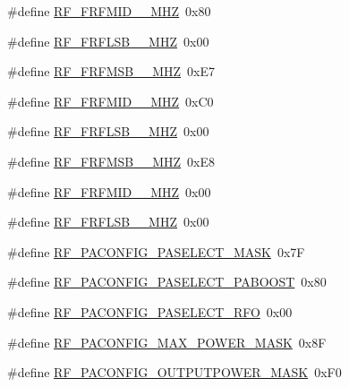 \begin{DoxyCompactItemize}
\item 
\#define \mbox{\hyperlink{sx1276_regs-_fsk_8h_a1b35ddffb5369efd6a34ded63724ceab}{R\+F\+\_\+\+F\+R\+F\+M\+I\+D\+\_\+\_\+\+M\+HZ}}~0x80
\item 
\#define \mbox{\hyperlink{sx1276_regs-_fsk_8h_ac664acd9a4e7749794f8a533a05436a1}{R\+F\+\_\+\+F\+R\+F\+L\+S\+B\+\_\+\_\+\+M\+HZ}}~0x00
\item 
\#define \mbox{\hyperlink{sx1276_regs-_fsk_8h_a038d10c481806a8f4f5165d91019ce50}{R\+F\+\_\+\+F\+R\+F\+M\+S\+B\+\_\+\_\+\+M\+HZ}}~0x\+E7
\item 
\#define \mbox{\hyperlink{sx1276_regs-_fsk_8h_a5f486d2c3784ae62187f57030d347b17}{R\+F\+\_\+\+F\+R\+F\+M\+I\+D\+\_\+\_\+\+M\+HZ}}~0x\+C0
\item 
\#define \mbox{\hyperlink{sx1276_regs-_fsk_8h_aafaad9f6003901f9081b92d207c67022}{R\+F\+\_\+\+F\+R\+F\+L\+S\+B\+\_\+\_\+\+M\+HZ}}~0x00
\item 
\#define \mbox{\hyperlink{sx1276_regs-_fsk_8h_a61fa44af0eda546fb2dd7a2d1e772e9f}{R\+F\+\_\+\+F\+R\+F\+M\+S\+B\+\_\+\_\+\+M\+HZ}}~0x\+E8
\item 
\#define \mbox{\hyperlink{sx1276_regs-_fsk_8h_a0fe5c603e40a6d7c28902efeefc14049}{R\+F\+\_\+\+F\+R\+F\+M\+I\+D\+\_\+\_\+\+M\+HZ}}~0x00
\item 
\#define \mbox{\hyperlink{sx1276_regs-_fsk_8h_abedb5dbcb3f48722c93379c37eb7cdee}{R\+F\+\_\+\+F\+R\+F\+L\+S\+B\+\_\+\_\+\+M\+HZ}}~0x00
\item 
\#define \mbox{\hyperlink{sx1276_regs-_fsk_8h_a1f6faf51858096a4381e494bc157dedd}{R\+F\+\_\+\+P\+A\+C\+O\+N\+F\+I\+G\+\_\+\+P\+A\+S\+E\+L\+E\+C\+T\+\_\+\+M\+A\+SK}}~0x7F
\item 
\#define \mbox{\hyperlink{sx1276_regs-_fsk_8h_ae9a12e879be43e88ad7cff8f48010a9e}{R\+F\+\_\+\+P\+A\+C\+O\+N\+F\+I\+G\+\_\+\+P\+A\+S\+E\+L\+E\+C\+T\+\_\+\+P\+A\+B\+O\+O\+ST}}~0x80
\item 
\#define \mbox{\hyperlink{sx1276_regs-_fsk_8h_a01b86de3552e662d9994a1c4c4d8c571}{R\+F\+\_\+\+P\+A\+C\+O\+N\+F\+I\+G\+\_\+\+P\+A\+S\+E\+L\+E\+C\+T\+\_\+\+R\+FO}}~0x00
\item 
\#define \mbox{\hyperlink{sx1276_regs-_fsk_8h_aa89d945546b59e43c22a245423d58378}{R\+F\+\_\+\+P\+A\+C\+O\+N\+F\+I\+G\+\_\+\+M\+A\+X\+\_\+\+P\+O\+W\+E\+R\+\_\+\+M\+A\+SK}}~0x8F
\item 
\#define \mbox{\hyperlink{sx1276_regs-_fsk_8h_a88306565c0c75c9421326683fdcb84e8}{R\+F\+\_\+\+P\+A\+C\+O\+N\+F\+I\+G\+\_\+\+O\+U\+T\+P\+U\+T\+P\+O\+W\+E\+R\+\_\+\+M\+A\+SK}}~0x\+F0
\item 

\end{DoxyCompactItemize}
